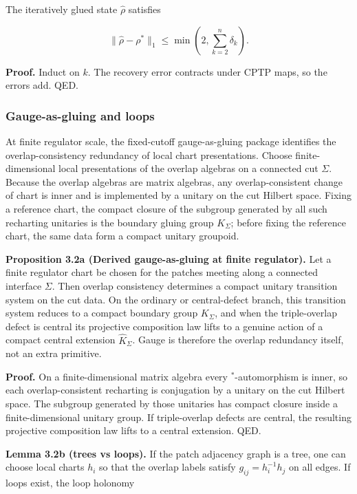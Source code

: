The iteratively glued state \(\hat{\rho}\) satisfies

\[
\| \hat{\rho} - \rho^{\ast} \|_1 \le \min\left(2, \sum_{k=2}^n \delta_k\right).
\]

\textbf{Proof.} Induct on \(k\). The recovery error contracts under CPTP maps, so the errors add. QED.

\subsubsection{Gauge-as-gluing and loops}\label{32-gauge-as-gluing-and-loops}

At finite regulator scale, the fixed-cutoff gauge-as-gluing package identifies the overlap-consistency redundancy of local chart presentations. Choose finite-dimensional local presentations of the overlap algebras on a connected cut \(\Sigma\). Because the overlap algebras are matrix algebras, any overlap-consistent change of chart is inner and is implemented by a unitary on the cut Hilbert space. Fixing a reference chart, the compact closure of the subgroup generated by all such recharting unitaries is the boundary gluing group \(K_\Sigma\); before fixing the reference chart, the same data form a compact unitary groupoid.

\textbf{Proposition 3.2a (Derived gauge-as-gluing at finite regulator).} Let a finite regulator chart be chosen for the patches meeting along a connected interface \(\Sigma\). Then overlap consistency determines a compact unitary transition system on the cut data. On the ordinary or central-defect branch, this transition system reduces to a compact boundary group \(K_\Sigma\), and when the triple-overlap defect is central its projective composition law lifts to a genuine action of a compact central extension \(\widehat K_\Sigma\). Gauge is therefore the overlap redundancy itself, not an extra primitive.

\textbf{Proof.} On a finite-dimensional matrix algebra every \(^*\)-automorphism is inner, so each overlap-consistent recharting is conjugation by a unitary on the cut Hilbert space. The subgroup generated by those unitaries has compact closure inside a finite-dimensional unitary group. If triple-overlap defects are central, the resulting projective composition law lifts to a central extension. QED.

\textbf{Lemma 3.2b (trees vs loops).} If the patch adjacency graph is a tree, one can choose local charts \(h_i\) so that the overlap labels satisfy \(g_{ij} = h_i^{-1} h_j\) on all edges. If loops exist, the loop holonomy

